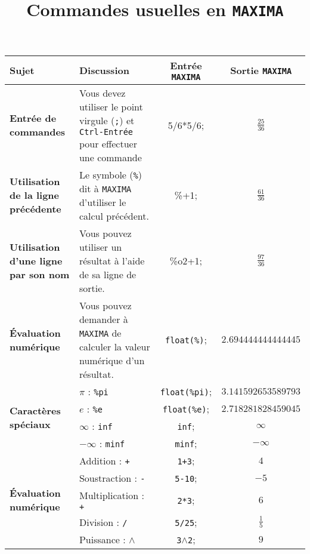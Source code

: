 \documentclass[8pt,landscape]{article}
\title{Commandes usuelles en \texttt{MAXIMA}}
\author{}
\date{}
\begin{document}
\maketitle

\begin{center}
\begin{longtable}{@{}p{4cm}p{10cm}cc@{}}
\toprule
\textbf{Sujet} & \textbf{Discussion} & \textbf{Entrée \texttt{MAXIMA}} & \textbf{Sortie \texttt{MAXIMA}} \\ 
\midrule
\endhead

\textbf{Entrée de commandes} & Vous devez utiliser le point virgule (\texttt{;}) et \texttt{Ctrl-Entrée} pour effectuer une commande &
5/6*5/6; & $\frac{25}{36}$ \\

\midrule

\textbf{Utilisation de la ligne précédente} & Le symbole (\texttt{\%}) dit à \texttt{MAXIMA} d'utiliser le calcul précédent. &
\%+1; & $\frac{61}{36}$ \\

\midrule

\textbf{Utilisation d'une ligne  par son nom} & Vous pouvez utiliser un résultat à l'aide de sa ligne de sortie. &
\%o2+1; & $\frac{97}{36}$ \\

\midrule

\textbf{Évaluation numérique} & Vous pouvez demander à \texttt{MAXIMA} de calculer la valeur numérique d'un résultat. &
\texttt{float(\%)}; & $2.694444444444445$ \\

\midrule

\multirow{4}{*}{\textbf{Caractères spéciaux}} & $\pi$ : \texttt{\%pi} & \texttt{float(\%pi)}; & $3.141592653589793$ \\
\cmidrule{2-4}
& $e$ : \texttt{\%e} & \texttt{float(\%e)}; & $2.718281828459045$ \\
\cmidrule{2-4}
& $\infty$ : \texttt{inf} & \texttt{inf}; & $\infty$ \\
\cmidrule{2-4}
& $-\infty$ : \texttt{minf} & \texttt{minf}; & $-\infty$ \\

\midrule

\multirow{5}{*}{\textbf{Évaluation numérique}} & Addition : \texttt{+} & \texttt{1+3}; & $4$ \\
\cmidrule{2-4}
& Soustraction : \texttt{-} & \texttt{5-10}; & $-5$ \\
\cmidrule{2-4}
& Multiplication : \texttt{+} & \texttt{2*3}; & $6$ \\
\cmidrule{2-4}
& Division : \texttt{/} & \texttt{5/25}; & $\frac{1}{5}$ \\
\cmidrule{2-4}
& Puissance : $\wedge$ & \texttt{3$\wedge$2}; & $9$ \\


\end{longtable}
\end{center}
\end{document}
